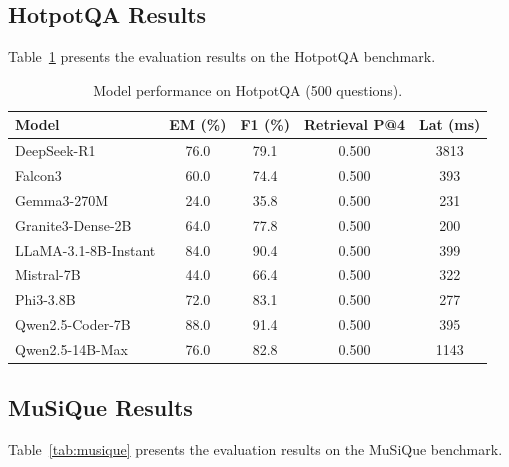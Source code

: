 \documentclass[12pt,a4paper]{article}
\begin{document}
\subsection{HotpotQA Results}

Table~\ref{tab:hotpotqa} presents the evaluation results on the HotpotQA benchmark.

\begin{table}[htbp]
  \centering
  \caption{Model performance on HotpotQA (500 questions).}
  \label{tab:hotpotqa}
  \begin{tabular}{lcccc}
    \hline
    \textbf{Model}
      & \textbf{EM (\%)}
      & \textbf{F1 (\%)}
      & \textbf{Retrieval P@4}
      & \textbf{Lat (ms)} \\
    \hline
    DeepSeek-R1            & 76.0 & 79.1 & 0.500 & 3813 \\
    Falcon3                & 60.0 & 74.4 & 0.500 &  393 \\
    Gemma3-270M            & 24.0 & 35.8 & 0.500 &  231 \\
    Granite3-Dense-2B      & 64.0 & 77.8 & 0.500 &  200 \\
    LLaMA-3.1-8B-Instant   & 84.0 & 90.4 & 0.500 &  399 \\
    Mistral-7B             & 44.0 & 66.4 & 0.500 &  322 \\
    Phi3-3.8B              & 72.0 & 83.1 & 0.500 &  277 \\
    Qwen2.5-Coder-7B       & 88.0 & 91.4 & 0.500 &  395 \\
    Qwen2.5-14B-Max        & 76.0 & 82.8 & 0.500 & 1143 \\
    \hline
  \end{tabular}
\end{table}

\subsection{MuSiQue Results}

Table~\ref{tab:musique} presents the evaluation results on the MuSiQue benchmark.
\end{document}
